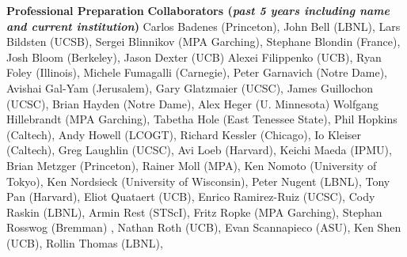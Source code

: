 \documentclass[11pt,letterpaper,english]{article}
\begin{document}
\begin{flushleft} {\bf Professional Preparation}
\vspace{-6pt}
{\bf Collaborators ({\emph{past 5 years including name and current institution}})} 
{\parindent 16pt
Carlos Badenes (Princeton),
John Bell (LBNL),
Lars Bildsten (UCSB),
Sergei Blinnikov (MPA Garching),
Stephane Blondin (France),
Josh Bloom (Berkeley),
Jason Dexter (UCB)
Alexei Filippenko (UCB),
Ryan Foley (Illinois),
Michele Fumagalli (Carnegie),
Peter Garnavich (Notre Dame),
Avishai Gal-Yam (Jerusalem), 
Gary Glatzmaier (UCSC),
James Guillochon (UCSC),
Brian Hayden (Notre Dame),
Alex Heger (U. Minnesota)
Wolfgang Hillebrandt (MPA Garching),
Tabetha Hole (East Tenessee State),
Phil Hopkins (Caltech),
Andy Howell (LCOGT),
Richard Kessler (Chicago),
Io Kleiser (Caltech),
Greg Laughlin (UCSC),
Avi Loeb (Harvard),
Keichi Maeda (IPMU),
Brian Metzger (Princeton),
Rainer Moll (MPA),
Ken Nomoto (University of Tokyo),
Ken Nordsieck (University of Wisconsin),
Peter Nugent (LBNL),
Tony Pan (Harvard),
Eliot Quataert (UCB),
Enrico Ramirez-Ruiz (UCSC),
Cody Raskin (LBNL),
Armin Rest (STScI),
Fritz Ropke (MPA Garching),
Stephan Rosswog (Bremman) ,
Nathan Roth (UCB),
Evan Scannapieco (ASU),
Ken Shen (UCB),
Rollin Thomas (LBNL),
}


\end{flushleft}
\end{document}
